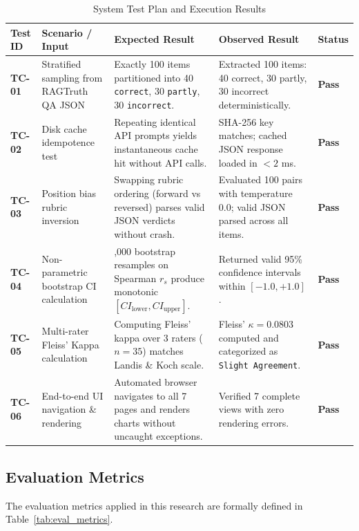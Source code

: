 \documentclass[11pt,a4paper]{article}
\renewcommand{\arraystretch}{1.2}
\begin{document}
\begin{table}[htbp]
\centering
\caption{System Test Plan and Execution Results}
\label{tab:test_cases}
\footnotesize
\renewcommand{\arraystretch}{1.25}
\begin{tabularx}{\linewidth}{|>{\centering\arraybackslash}p{1.2cm}|>{\RaggedRight}p{3.0cm}|>{\RaggedRight}X|>{\RaggedRight}X|>{\centering\arraybackslash}p{1.2cm}|}
\hline
\rowcolor{tableheader}
Test ID & Scenario / Input & Expected Result & Observed Result & Status \\
\hline
\textbf{TC-01} & Stratified sampling from RAGTruth QA JSON & Exactly 100 items partitioned into 40 \texttt{correct}, 30 \texttt{partly}, 30 \texttt{incorrect}. & Extracted 100 items: 40 correct, 30 partly, 30 incorrect deterministically. & \textbf{Pass} \\
\hline
\textbf{TC-02} & Disk cache idempotence test & Repeating identical API prompts yields instantaneous cache hit without API calls. & SHA-256 key matches; cached JSON response loaded in $< 2$ ms. & \textbf{Pass} \\
\hline
\textbf{TC-03} & Position bias rubric inversion & Swapping rubric ordering (forward vs reversed) parses valid JSON verdicts without crash. & Evaluated 100 pairs with temperature 0.0; valid JSON parsed across all items. & \textbf{Pass} \\
\hline
\textbf{TC-04} & Non-parametric bootstrap CI calculation & 1,000 bootstrap resamples on Spearman $r_s$ produce monotonic $[CI_{\text{lower}}, CI_{\text{upper}}]$. & Returned valid 95\% confidence intervals within $[-1.0, +1.0]$. & \textbf{Pass} \\
\hline
\textbf{TC-05} & Multi-rater Fleiss' Kappa calculation & Computing Fleiss' kappa over 3 raters ($n=35$) matches Landis \& Koch scale. & Fleiss' $\kappa = 0.0803$ computed and categorized as \texttt{Slight Agreement}. & \textbf{Pass} \\
\hline
\textbf{TC-06} & End-to-end UI navigation \& rendering & Automated browser navigates to all 7 pages and renders charts without uncaught exceptions. & Verified 7 complete views with zero rendering errors. & \textbf{Pass} \\
\hline
\end{tabularx}
\end{table}

\subsection{Evaluation Metrics}
The evaluation metrics applied in this research are formally defined in Table~\ref{tab:eval_metrics}.
\end{document}

